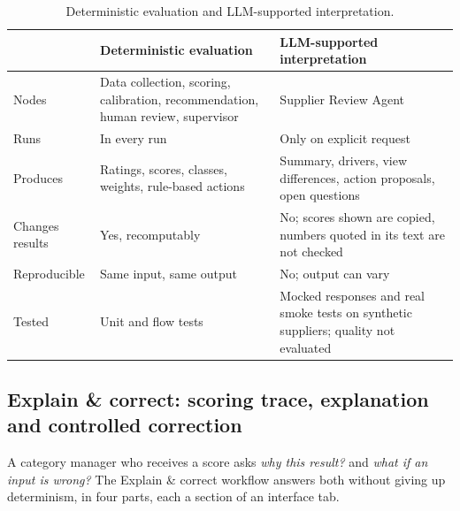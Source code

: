 \documentclass[10pt,twocolumn,a4paper]{article}
\newcommand{\dimhead}[1]{\textbf{#1}}
\begin{document}
\begin{table}[t]
  \caption{Deterministic evaluation and LLM-supported interpretation.}
  \label{tab:aireview}
  \small
  \begin{tabular}{@{}P{0.23\columnwidth}P{0.32\columnwidth}P{0.32\columnwidth}@{}}
    \toprule
     & \dimhead{Deterministic evaluation} & \dimhead{LLM-supported interpretation} \\
    \midrule
    Nodes & Data collection, scoring, calibration, recommendation, human review, supervisor & Supplier Review Agent \\
    Runs & In every run & Only on explicit request \\
    Produces & Ratings, scores, classes, weights, rule-based actions & Summary, drivers, view differences, action proposals, open questions \\
    Changes results & Yes, recomputably & No; scores shown are copied, numbers quoted in its text are not checked \\
    Reproducible & Same input, same output & No; output can vary \\
    Tested & Unit and flow tests & Mocked responses and real smoke tests on synthetic suppliers; quality not evaluated \\
    \bottomrule
  \end{tabular}
\end{table}

\subsection{Explain \& correct: scoring trace, explanation and controlled correction}
\label{sec:explain}
A category manager who receives a score asks \emph{why this result?} and \emph{what if an
input is wrong?} The Explain \& correct workflow answers both without giving up determinism,
in four parts, each a section of an interface tab.
\end{document}
